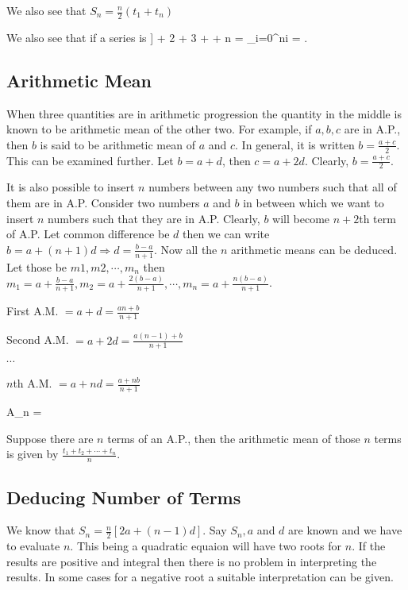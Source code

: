 We also see that $S_n = \frac{n}{2}(t_1 + t_n)$

We also see that if a series is \placeformula[eq:progression-nn]]\startformula{} + 2 + 3 +
  \cdots + n = \sum_{i=0}^ni = .\stopformula

\subsection{Arithmetic Mean}
When three quantities are in arithmetic progression the quantity in the middle is known to be arithmetic mean of the other two. For
example, if $a, b, c$ are in A.P., then $b$ is said to be arithmetic mean of $a$ and $c$. In general, it is written $b = \frac{a +
  c}{2}$. This can be examined further. Let $b = a + d$, then $c = a + 2d$. Clearly, $b = \frac{a + c}{2}$.

It is also possible to insert $n$ numbers between any two numbers such that all of them are in A.P. Consider two numbers $a$ and
$b$ in between which we want to insert $n$ numbers such that they are in A.P. Clearly, $b$ will become $n +2$th term of A.P. Let
common difference be $d$ then we can write $b = a + (n + 1)d \Rightarrow d = \frac{b - a}{n + 1}$. Now all the $n$ arithmetic means
can be deduced. Let those be $m1, m2, \cdots, m_n$ then $m_1 = a + \frac{b - a}{n + 1}, m_2 = a + \frac{2(b - a)}{n + 1}, \cdots,
m_n = a + \frac{n(b - a)}{n + 1}$.

First A.M. $= a + d = \frac{an + b}{n +1}$

Second A.M. $= a + 2d = \frac{a(n - 1) + b}{n + 1}$

$\cdots$

$n$th A.M. $= a + nd = \frac{a + nb}{n + 1}$

\startformula A_n = \stopformula

Suppose there are $n$ terms of an A.P., then the arithmetic mean of those $n$ terms is given by $\frac{t_1 + t_2 + \cdots +
  t_n}{n}$.

\subsection{Deducing Number of Terms}
We know that $S_n = \frac{n}{2}[2a + (n - 1)d]$. Say $S_n, a$ and $d$ are known and we have to evaluate $n$. This being a quadratic
equaion will have two roots for $n$. If the results are positive and integral then there is no problem in interpreting the
results. In some cases for a negative root a suitable interpretation can be given.

